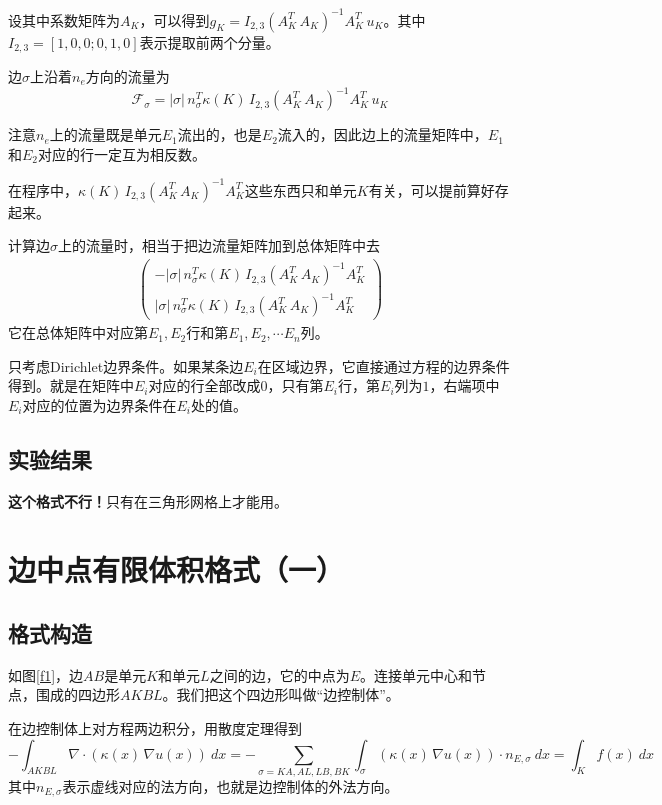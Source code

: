 \documentclass[12pt,a4paper]{article}
\theoremstyle{plain}
\begin{document}
设其中系数矩阵为$A_K$，可以得到$g_K = I_{2,3} (A_K^T \, A_K)^{-1} A_K^T \, u_K$。其中$I_{2,3} = [1,0,0; 0,1,0]$表示提取前两个分量。

边$\sigma$上沿着$n_e$方向的流量为
\begin{equation*}
\mathcal{F}_{\sigma} = |\sigma| \, n_{\sigma}^T \kappa(K) \, I_{2,3} (A_K^T \, A_K)^{-1} A_K^T \, u_K
\end{equation*}

注意$n_e$上的流量既是单元$E_1$流出的，也是$E_2$流入的，因此边上的流量矩阵中，$E_1$和$E_2$对应的行一定互为相反数。

在程序中，$\kappa(K) \, I_{2,3} (A_K^T \, A_K)^{-1} A_K^T$这些东西只和单元$K$有关，可以提前算好存起来。

计算边$\sigma$上的流量时，相当于把边流量矩阵加到总体矩阵中去
\begin{align*}
\left(
\begin{matrix}
- |\sigma| \, n_{\sigma}^T \kappa(K) \, I_{2,3} (A_K^T \, A_K)^{-1} A_K^T \\
|\sigma| \, n_{\sigma}^T \kappa(K) \, I_{2,3} (A_K^T \, A_K)^{-1} A_K^T
\end{matrix}
\right)
\end{align*}
它在总体矩阵中对应第$E_1, E_2$行和第$E_1, E_2, \cdots E_n$列。


只考虑Dirichlet边界条件。如果某条边$E_i$在区域边界，它直接通过方程的边界条件得到。就是在矩阵中$E_i$对应的行全部改成0，只有第$E_i$行，第$E_i$列为$1$，右端项中$E_i$对应的位置为边界条件在$E_i$处的值。

\subsection*{实验结果}

\textbf{这个格式不行！}只有在三角形网格上才能用。

\section*{边中点有限体积格式（一）}

\subsection*{格式构造}

如图\ref{f1}，边$AB$是单元$K$和单元$L$之间的边，它的中点为$E$。连接单元中心和节点，围成的四边形$AKBL$。我们把这个四边形叫做“边控制体”。

在边控制体上对方程两边积分，用散度定理得到
\begin{equation*}
- \int_{AKBL} \nabla \cdot (\kappa(x) \, \nabla u(x)) \ dx = - \sum_{\sigma = KA, AL, LB, BK} \int_{\sigma} (\kappa(x) \, \nabla u(x)) \cdot n_{E, \sigma} \ dx = \int_{K} f(x) \ dx
\end{equation*}
其中$n_{E, \sigma}$表示虚线对应的法方向，也就是边控制体的外法方向。
\end{document}

